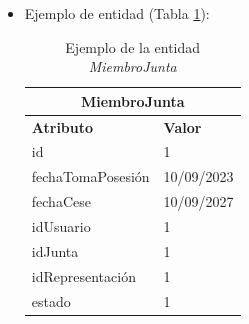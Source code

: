 \begin{itemize}
    \item Ejemplo de entidad (Tabla \ref{table:T-MiembroJunta}):

    \begin{table}[H]
    \centering
        \begin{tabular}{ |p{6cm}||p{6cm}|  }
             \hline
                \multicolumn{2}{|c|}{\textbf{MiembroJunta}} \\
             \hline
                 \textbf{Atributo} & \textbf{Valor} \\
             \hline
                 id & 1 \\
             \hline
                 fechaTomaPosesión & 10/09/2023 \\
             \hline
                 fechaCese & 10/09/2027 \\
             \hline
                 idUsuario & 1 \\
             \hline
                 idJunta & 1 \\
            \hline
                 idRepresentación & 1 \\
             \hline
                 estado & 1 \\
        \end{tabular}
        \caption{Ejemplo de la entidad \textit{MiembroJunta}}
        \label{table:T-MiembroJunta}
    \end{table}
\end{itemize}

